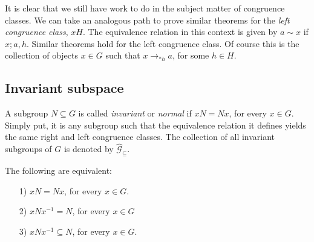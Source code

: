 \documentclass [12pt]{book}
\begin{document}
It is clear that we still have work to do in the subject matter of congruence classes. We can take an analogous path to prove similar theorems for the \textit{left congruence class}, $xH$. The equivalence relation in this context is given by $a\sim x$ if $x;a,h$. Similar theorems hold for the left congruence class. Of course this is the collection of objects $x\in G$ such that $x\rightarrow_{*h}a$, for some $h\in H$.

	\subsection{Invariant subspace}

A subgroup $N\subseteq G$ is called \textit{invariant} or \textit{normal} if $xN=Nx$, for every $x\in G$. Simply put, it is any subgroup such that the equivalence relation it defines yields the same right and left congruence classes. The collection of all invariant subgroups of $G$ is denoted by $\hat{\mathcal{G}}_{\subseteq}$.

\begin{theorem}The following are equivalent:\begin{itemize}\item[1)]$xN=Nx$, for every $x\in G$.\item[2)]$xNx^{-1}
=N$, for every $x\in G$\item[3)] $xNx^{-1}\subseteq N$, for every $x\in G$. \end{itemize}\end{theorem}
\end{document}
